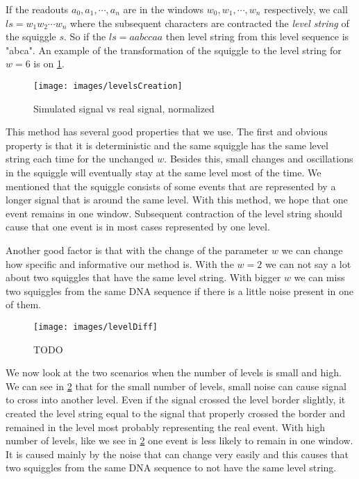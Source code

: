 If the readouts $a_0, a_1, \cdots, a_n$ are in the windows $w_0, w_1, \cdots ,w_n$
respectively, we call $ls=w_1w_2\cdots w_n$ where the subsequent characters are contracted
the \textit{level string} of the squiggle $s$. So if the $ls=aabccaa$ then level string from this level sequence is "abca".
An example of the transformation of the squiggle to the level string for $w=6$ is on \ref{obr:levelsCreation}.


\begin{figure}
\centerline{\texttt{[image: images/levelsCreation]}}
\caption[TODO]{Simulated signal vs real signal, normalized}
\label{obr:levelsCreation}
\end{figure}

This method has several good properties that we use. The first and obvious
property is that it is deterministic and the same squiggle has the same level
string each time for the unchanged $w$. Besides this, small changes and oscillations in the squiggle will
eventually stay at the same level most of the time. We mentioned that the squiggle
consists of some events that are represented by a longer signal that is around the same level.
With this method, we hope that one event remains in one window. Subsequent
contraction of the level string should cause that one event is in most cases represented by
one level.

Another good factor is that with the change of the parameter $w$ we can change how specific
and informative our method is. With the $w=2$ we can not say a lot about two squiggles
that have the same level string. With bigger $w$ we can miss two squiggles from
the same DNA sequence if there is a little noise present in one of them.

\begin{figure}
\centerline{\texttt{[image: images/levelDiff]}}
\caption[TODO]{TODO}
\label{obr:levelDiff}
\end{figure}

We now look at the two scenarios when the number of levels is small and high.
We can see in \ref{obr:levelDiff} that for the small number of levels, small noise can cause signal to cross into another level. 
Even if the signal crossed the level border slightly, it created the level
string equal to the signal that properly crossed the border and remained in the level
most probably representing the real event. With high number of levels, like we see in \ref{obr:levelDiff} one event is less likely to remain in one window. It is caused mainly by the noise that can change very easily and this causes that
two squiggles from the same DNA sequence to not have the same level string.

